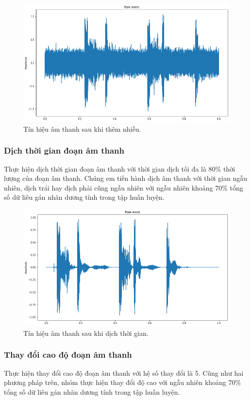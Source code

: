\documentclass[a4paper, 12pt]{article}
\begin{document}
\begin{figure}[!h]
\captionsetup{width=0.8\textwidth}
\centering
\includegraphics[width=12cm]{images/3.2.png}
\caption{Tín hiệu âm thanh sau khi thêm nhiễu.}
\end{figure}

\subsubsection{Dịch thời gian đoạn âm thanh}
Thực hiện dịch thời gian đoạn âm thanh với thời gian dịch tối đa là 80\% thời lượng của đoạn âm thanh. Chúng em tiến hành dịch âm thanh với thời gian ngẫu nhiên, dịch trái hay dịch phải cũng ngẫu nhiên với ngẫu nhiên khoảng 70\% tổng số dữ liêu gán nhãn dương tính trong tập huấn luyện.

\begin{figure}[!h]
\captionsetup{width=0.8\textwidth}
\centering
\includegraphics[width=12.5cm]{images/3.3.png}
\caption{Tín hiệu âm thanh sau khi dịch thời gian.}
\end{figure}


\subsubsection{Thay đổi cao độ đoạn âm thanh}
Thực hiện thay đổi cao độ đoạn âm thanh với hệ số thay đổi là 5. Cũng như hai phương pháp trên, nhóm thực hiện thay đổi độ cao với ngẫu nhiên khoảng 70\% tổng số dữ liêu gán nhãn dương tính trong tập huấn luyện.
\end{document}

